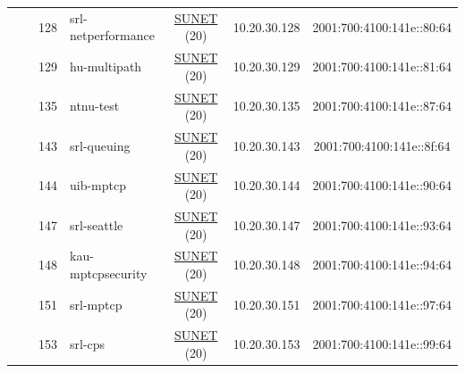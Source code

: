 \begin{small}
\begin{center}
\begin{longtable}{|c|c|c|c|c|c|c|c|}
  &  & \tiny{128} & \multicolumn{1}{|l|}{\tiny{srl-netperformance}} & \multicolumn{2}{|c|}{\tiny{\href{http://www.sunet.se}{SUNET} (20)}} & \tiny{10.20.30.128} & \tiny{2001:700:4100:141e::80:64} \\* \cline{3-3}\cline{4-4}\cline{5-5}\cline{6-6}\cline{7-7}\cline{8-8}
  &  & \tiny{129} & \multicolumn{1}{|l|}{\tiny{hu-multipath}} & \multicolumn{2}{|c|}{\tiny{\href{http://www.sunet.se}{SUNET} (20)}} & \tiny{10.20.30.129} & \tiny{2001:700:4100:141e::81:64} \\* \cline{3-3}\cline{4-4}\cline{5-5}\cline{6-6}\cline{7-7}\cline{8-8}
  &  & \tiny{135} & \multicolumn{1}{|l|}{\tiny{ntnu-test}} & \multicolumn{2}{|c|}{\tiny{\href{http://www.sunet.se}{SUNET} (20)}} & \tiny{10.20.30.135} & \tiny{2001:700:4100:141e::87:64} \\* \cline{3-3}\cline{4-4}\cline{5-5}\cline{6-6}\cline{7-7}\cline{8-8}
  &  & \tiny{143} & \multicolumn{1}{|l|}{\tiny{srl-queuing}} & \multicolumn{2}{|c|}{\tiny{\href{http://www.sunet.se}{SUNET} (20)}} & \tiny{10.20.30.143} & \tiny{2001:700:4100:141e::8f:64} \\* \cline{3-3}\cline{4-4}\cline{5-5}\cline{6-6}\cline{7-7}\cline{8-8}
  &  & \tiny{144} & \multicolumn{1}{|l|}{\tiny{uib-mptcp}} & \multicolumn{2}{|c|}{\tiny{\href{http://www.sunet.se}{SUNET} (20)}} & \tiny{10.20.30.144} & \tiny{2001:700:4100:141e::90:64} \\* \cline{3-3}\cline{4-4}\cline{5-5}\cline{6-6}\cline{7-7}\cline{8-8}
  &  & \tiny{147} & \multicolumn{1}{|l|}{\tiny{srl-seattle}} & \multicolumn{2}{|c|}{\tiny{\href{http://www.sunet.se}{SUNET} (20)}} & \tiny{10.20.30.147} & \tiny{2001:700:4100:141e::93:64} \\* \cline{3-3}\cline{4-4}\cline{5-5}\cline{6-6}\cline{7-7}\cline{8-8}
  &  & \tiny{148} & \multicolumn{1}{|l|}{\tiny{kau-mptcpsecurity}} & \multicolumn{2}{|c|}{\tiny{\href{http://www.sunet.se}{SUNET} (20)}} & \tiny{10.20.30.148} & \tiny{2001:700:4100:141e::94:64} \\* \cline{3-3}\cline{4-4}\cline{5-5}\cline{6-6}\cline{7-7}\cline{8-8}
  &  & \tiny{151} & \multicolumn{1}{|l|}{\tiny{srl-mptcp}} & \multicolumn{2}{|c|}{\tiny{\href{http://www.sunet.se}{SUNET} (20)}} & \tiny{10.20.30.151} & \tiny{2001:700:4100:141e::97:64} \\* \cline{3-3}\cline{4-4}\cline{5-5}\cline{6-6}\cline{7-7}\cline{8-8}
  &  & \tiny{153} & \multicolumn{1}{|l|}{\tiny{srl-cps}} & \multicolumn{2}{|c|}{\tiny{\href{http://www.sunet.se}{SUNET} (20)}} & \tiny{10.20.30.153} & \tiny{2001:700:4100:141e::99:64} \\* \cline{3-3}\cline{4-4}\cline{5-5}\cline{6-6}\cline{7-7}\cline{8-8}

\end{longtable}
\end{center}
\end{small}
